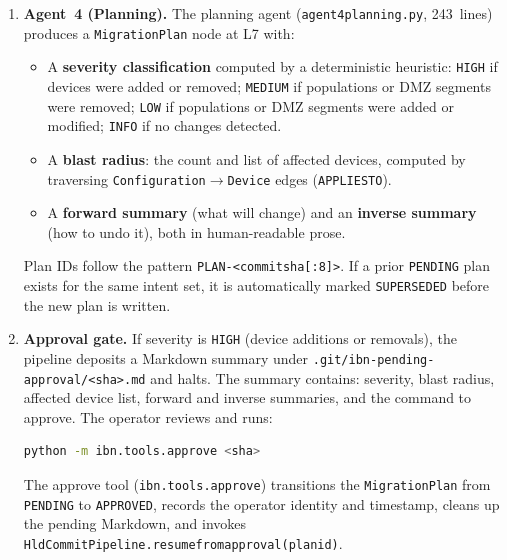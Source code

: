 \documentclass[acmtog]{acmart}
\renewcommand\_{\textunderscore\allowbreak}
\begin{document}
\begin{enumerate}[label=\textbf{Stage~\arabic*.},leftmargin=3em]
    Zone inference is currently rule-based: DMZ targets map to
    \texttt{DMZ\_INFRA}, guest/contractor/visitor targets to
    \texttt{GUEST}, all others to \texttt{USER}. Device-only commits
    (no population or DMZ changes) short-circuit this stage entirely:
    Agent~2 reports \texttt{skipped} and the pipeline continues with
    the existing intent set.

  \item \textbf{Agent~4 (Planning).}
    The planning agent (\texttt{agent4\_planning.py}, 243~lines)
    produces a \texttt{MigrationPlan} node at L7 with:
    \begin{itemize}
      \item A \textbf{severity classification} computed by a
        deterministic heuristic:
        \texttt{HIGH} if devices were added or removed;
        \texttt{MEDIUM} if populations or DMZ segments were removed;
        \texttt{LOW} if populations or DMZ segments were added or
        modified; \texttt{INFO} if no changes detected.
      \item A \textbf{blast radius}: the count and list of affected
        devices, computed by traversing
        \texttt{Configuration}$\rightarrow$\texttt{Device} edges
        (\texttt{APPLIES\_TO}).
      \item A \textbf{forward summary} (what will change) and an
        \textbf{inverse summary} (how to undo it), both in
        human-readable prose.
    \end{itemize}
    Plan IDs follow the pattern \texttt{PLAN-<commit\_sha[:8]>}.
    If a prior \texttt{PENDING} plan exists for the same intent set,
    it is automatically marked \texttt{SUPERSEDED} before the new
    plan is written.

  \item \textbf{Approval gate.}
    If severity is \texttt{HIGH} (device additions or removals), the
    pipeline deposits a Markdown summary under
    \texttt{.git/\allowbreak{}ibn-pending-approval/\allowbreak{}<sha>.md} and halts. The
    summary contains: severity, blast radius, affected device list,
    forward and inverse summaries, and the command to approve. The
    operator reviews and runs:

    \begin{lstlisting}[language=bash,numbers=none]
python -m ibn.tools.approve <sha>
    \end{lstlisting}

    The approve tool (\texttt{ibn.tools.approve}) transitions the
    \texttt{MigrationPlan} from \texttt{PENDING} to \texttt{APPROVED},
    records the operator identity and timestamp, cleans up the pending
    Markdown, and invokes
    \texttt{HldCommit\-Pipeline.\allowbreak{}resume\_from\_approval(\allowbreak{}plan\_id)}.


\end{enumerate}
\end{document}
